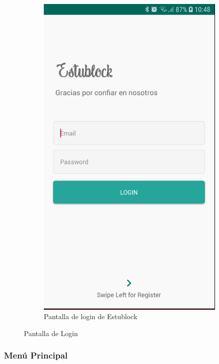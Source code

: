 \begin{figure}[hbt]
\begin{subfigure}[b]{0.4\linewidth}
        \includegraphics[width=0.7\linewidth]{figs/Desarrollo/Interfaz/estublock_login}
        \caption[Estublock Login]{Pantalla de login de Estublock}
	\end{subfigure} 
	\caption[Pantalla de Login]{Pantalla de Login}
	\label{fig:pantalla_login}
\end{figure}

\subsubsection{Menú Principal}

